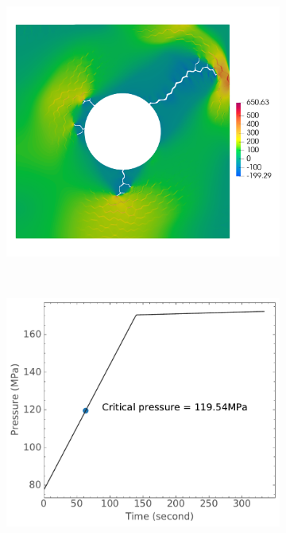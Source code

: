 \begin{figure}[htb!]
\begin{subfigure}[t]{0.32\linewidth}
    \caption{}
  \end{subfigure}
  \begin{subfigure}[t]{0.32\linewidth}
    \centering
    \includegraphics[width=\linewidth]{Chapter3/figures/r5_ext0_stress}
    \caption{}
  \end{subfigure}\\
  \begin{subfigure}[t]{0.32\linewidth}
    \centering
    \includegraphics[width=\linewidth]{Chapter3/figures/bubble_pressure_r0.5_ext30_rod196}

\end{subfigure}
\end{figure}
